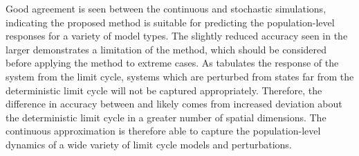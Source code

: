 Good agreement is seen between the continuous and stochastic simulations, indicating the proposed method is suitable for predicting the population-level responses for a variety of model types. 
The slightly reduced accuracy seen in the larger  demonstrates a limitation of the method, which should be considered before applying the method to extreme cases. 
As  tabulates the response of the system from the limit cycle, systems which are perturbed from states far from the deterministic limit cycle will not be captured appropriately. 
Therefore, the difference in accuracy between  and  likely comes from increased deviation about the deterministic limit cycle in a greater number of spatial dimensions. 
The continuous approximation is therefore able to capture the population-level dynamics of a wide variety of limit cycle models and perturbations.

